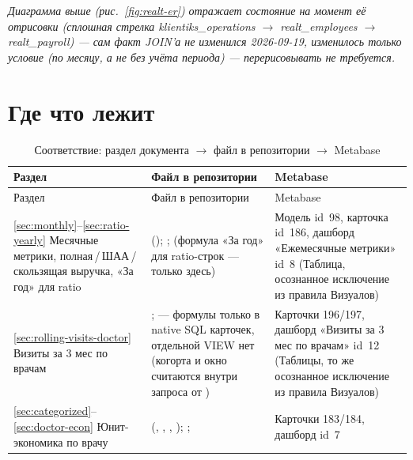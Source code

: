\documentclass[11pt,a4paper]{article}
\begin{document}
\textit{Диаграмма выше (рис.~\ref{fig:realt-er}) отражает состояние на
момент её отрисовки (сплошная стрелка klientiks\_operations
$\to$ realt\_employees $\to$ realt\_payroll) --- сам факт JOIN'а не
изменился 2026-09-19, изменилось только условие (по месяцу, а не
\texttt{} без учёта периода) --- перерисовывать не требуется.}

\section{Где что лежит}

\small
\begin{longtable}{@{}L{4cm}L{7.3cm}L{4cm}@{}}
\caption{Соответствие: раздел документа $\to$ файл в репозитории $\to$
Metabase}
\label{tab:where}\\
\toprule
Раздел & Файл в репозитории & Metabase \\
\midrule
\endfirsthead
\toprule
Раздел & Файл в репозитории & Metabase \\
\midrule
\endhead
\bottomrule
\endfoot
\ref{sec:monthly}--\ref{sec:ratio-yearly} Месячные метрики,
  полная\,/\,ШАА\,/\,скользящая выручка, «За год» для ratio &
  \texttt{}
  (\texttt{}); \texttt{};
  \texttt{} (формула «За год» для ratio-строк ---
  только здесь) & Модель id~98, карточка id~186, дашборд «Ежемесячные
  метрики» id~8 (Таблица, осознанное исключение из правила Визуалов) \\
\ref{sec:rolling-visits-doctor} Визиты за 3 мес по врачам &
  \texttt{};
  \texttt{} --- формулы только в
  native SQL карточек, отдельной VIEW нет (когорта и окно считаются
  внутри запроса от \texttt{}) &
  Карточки 196/197, дашборд «Визиты за 3 мес по врачам» id~12 (Таблицы,
  то же осознанное исключение из правила Визуалов) \\
\ref{sec:categorized}--\ref{sec:doctor-econ} Юнит-экономика по врачу &
  \texttt{} (\texttt{},
  \texttt{}, \texttt{},
  \texttt{}); \texttt{};
  \texttt{} & Карточки 183/184, дашборд id~7 \\

\end{longtable}
\end{document}

